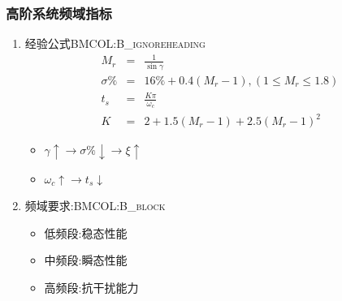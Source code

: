 \documentclass[table]{beamer}
\begin{document}
\subsubsection{高阶系统频域指标}
\label{sec:org56b31d8}
\begin{enumerate}
\item 经验公式\hfill{}\textsc{BMCOL:B\_ignoreheading}
\label{sec:orgb8887cc}
\begin{eqnarray*}
M_r & = & \frac{1}{\sin\gamma}\\
\sigma\% &=& 16\%+0.4(M_r-1), (1\leq M_r\leq 1.8) \\
t_s &=& \frac{K\pi}{\omega_c}\\
K&=& 2+1.5(M_r-1)+2.5(M_r-1)^2 
\end{eqnarray*}

\begin{itemize}
\item <2->\(\gamma\uparrow \rightarrow \sigma\%\downarrow \rightarrow \xi\uparrow\)
\item <3->\(\omega_c\uparrow \rightarrow t_s\downarrow\)
\end{itemize}

\item 频域要求:\hfill{}\textsc{BMCOL:B\_block}
\label{sec:orgee6812b}
\begin{itemize}
\item 低频段:稳态性能
\item 中频段:瞬态性能
\item 高频段:抗干扰能力
\end{itemize}
\end{enumerate}
\end{document}
